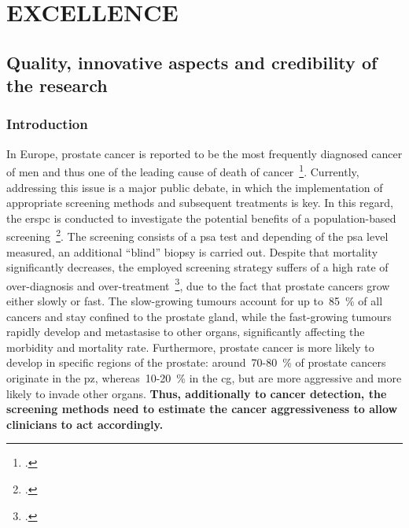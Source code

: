 \section{EXCELLENCE}
\label{sec:excellence}

\subsection{Quality, innovative aspects and credibility of the research}
\label{sec:quality}

\subsubsection{Introduction}
\label{sec:introduction}

In Europe, prostate cancer is reported to be the most frequently diagnosed cancer of men and thus one of the leading cause of death of cancer~\footcite{Ferlay2013}. 
Currently, addressing this issue is a major public debate, in which the implementation of appropriate screening methods and subsequent treatments is key.
In this regard, the \ac{erspc} is conducted to investigate the potential benefits of a population-based screening~\footcite{Schroder2015}. 
The screening consists of a \ac{psa} test and depending of the \ac{psa} level measured, an additional ``blind'' biopsy is carried out. 
Despite that mortality significantly decreases, the employed screening strategy suffers of a high rate of over-diagnosis and over-treatment~\footcite{Delpierre2013}, due to the fact that prostate cancers grow either slowly or fast.
The slow-growing tumours account for up to~85~\% of all cancers and stay confined to the prostate gland, while the fast-growing tumours rapidly develop and metastasise to other organs, significantly affecting the morbidity and mortality rate.
Furthermore, prostate cancer is more likely to develop in specific regions of the prostate: around~70-80~\% of prostate cancers originate in the \ac{pz}, whereas~10-20~\% in the \ac{cg}, but are more aggressive and more likely to invade other organs. 
\textbf{Thus, additionally to cancer detection, the screening methods need to estimate the cancer aggressiveness to allow clinicians to act accordingly.}


